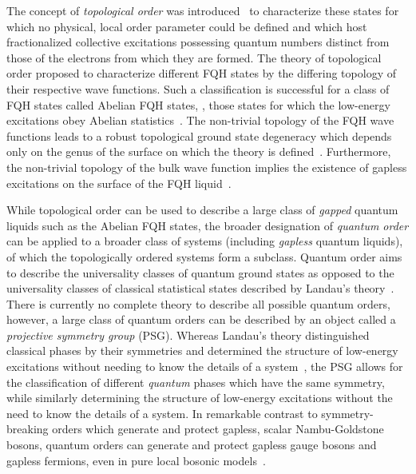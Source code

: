 The concept of \textit{topological order} was introduced~\cite{WenJMPB1990,WenAiP1995} to characterize these states for which no physical, local order parameter could be defined and which host fractionalized collective excitations possessing quantum numbers distinct from those of the electrons from which they are formed.
The theory of topological order proposed to characterize different FQH states by the differing topology of their respective wave functions.
Such a classification is successful for a class of FQH states called Abelian FQH states, \ie, those states for which the low-energy excitations obey Abelian statistics~\cite{BlokPRB1990a,BlokPRB1990b,ReadPRL1990,FroehlichNPB1991,FroehlichRMP1993}.
The non-trivial topology of the FQH wave functions leads to a robust topological ground state degeneracy which depends only on the genus of the surface on which the theory is defined~\cite{HaldanePRL1983,HaldanePRB1985,WenPRB1990}.
Furthermore, the non-trivial topology of the bulk wave function implies the existence of gapless excitations on the surface of the FQH liquid~\cite{WenIJMP1992}.

While topological order can be used to describe a large class of \textit{gapped} quantum liquids such as the Abelian FQH states, the broader designation of \textit{quantum order} can be applied to a broader class of systems (including \textit{gapless} quantum liquids), of which the topologically ordered systems form a subclass.
Quantum order aims to describe the universality classes of quantum ground states as opposed to the universality classes of classical statistical states described by Landau's theory~\cite{WenPRB2002,WenPLA2002}.
There is currently no complete theory to describe all possible quantum orders, however, a large class of quantum orders can be described by an object called a \textit{projective symmetry group} (PSG).
Whereas Landau's theory distinguished classical phases by their symmetries and determined the structure of low-energy excitations without needing to know the details of a system~\cite{NambuPRL1960,GoldstoneINC1961}, the PSG allows for the classification of different \textit{quantum} phases which have the same symmetry, while similarly determining the structure of low-energy excitations without the need to know the details of a system.
In remarkable contrast to symmetry-breaking orders which generate and protect gapless, scalar Nambu-Goldstone bosons, quantum orders can generate and protect gapless gauge bosons and gapless fermions, even in pure local bosonic models~\cite{Wen2004}.

